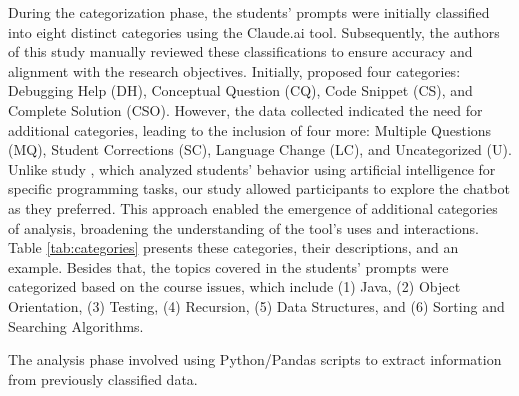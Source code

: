 \documentclass[sn-apa]{sn-jnl} %
\begin{document}
During the categorization phase, the students' prompts were initially classified
into eight distinct categories using the Claude.ai \citep{claude} tool.
Subsequently, the authors of this study manually reviewed these classifications
to ensure accuracy and alignment with the research objectives.
Initially, \cite{Ghimire24} proposed four categories: Debugging Help (DH),
Conceptual Question (CQ), Code Snippet (CS), and Complete Solution (CSO).
However, the data collected indicated the need for additional categories,
leading to the inclusion of four more: Multiple Questions (MQ), Student
Corrections (SC), Language Change (LC), and Uncategorized (U). Unlike study
\cite{Ghimire24}, which analyzed students' behavior using artificial
intelligence for specific programming tasks, our study allowed participants to
explore the chatbot as they preferred. This approach enabled the emergence of
additional categories of analysis, broadening the understanding of the tool's
uses and interactions. Table \ref{tab:categories} presents these categories,
their descriptions, and an example. Besides that, the topics covered in the
students' prompts were categorized based on the course issues, which include
(1) Java, (2) Object Orientation, (3) Testing, (4) Recursion, (5) Data
Structures, and (6) Sorting and Searching Algorithms.

The analysis phase involved using Python/Pandas scripts to extract information
from previously classified data.



\end{document}
